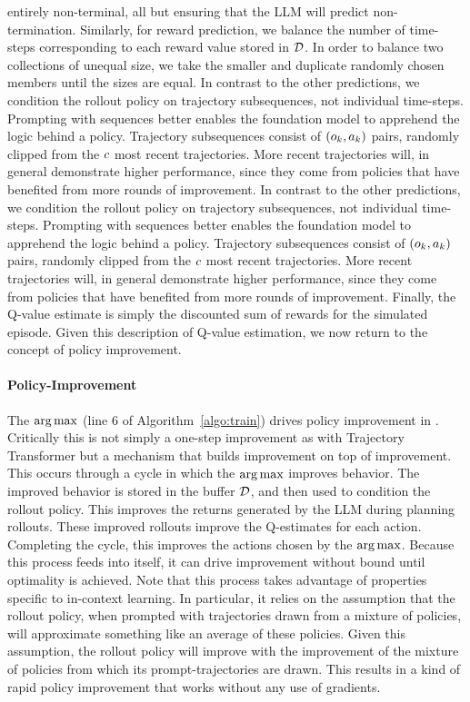 \documentclass{article}
\begin{document}
entirely non-terminal, all but ensuring that the LLM will predict
non-termination. Similarly, for
reward prediction, we balance the number of time-steps corresponding to each
reward value stored in $\mathcal{D}$. In order to balance two collections of
unequal size, we take the smaller and duplicate randomly chosen members
until the sizes are equal.
In contrast to the other predictions, we condition the rollout policy on
trajectory subsequences, not individual time-steps. Prompting with sequences
better enables the foundation model to apprehend the logic behind a policy. Trajectory
subsequences consist of $(\Obs_{k}, \Act_{k})$ pairs, randomly clipped from
the $c$ most recent trajectories. More recent trajectories will, in
general demonstrate higher performance, since they come from policies that have
benefited from more rounds of improvement.
In contrast to the other predictions, we condition the rollout policy on
trajectory subsequences, not individual time-steps. Prompting with sequences
better enables the foundation model to apprehend the logic behind a policy. Trajectory
subsequences consist of $(\Obs_{k}, \Act_{k})$ pairs, randomly clipped from
the $c$ most recent trajectories. More recent trajectories will, in
general demonstrate higher performance, since they come from policies that have
benefited from more rounds of improvement.
Finally, the Q-value estimate is simply the discounted sum of rewards for the
simulated episode. Given this description of Q-value estimation, we now return
to the concept of policy improvement.
\lstset{style=mystyle}
\def\graycolor{\color{lightgray}}
\def\blackcolor{\color{black}}
\paragraph{Policy-Improvement} The $\arg\max$ (line 6 of
Algorithm~\ref{algo:train}) drives policy improvement in \Algorithm{}.
Critically this is not simply a one-step improvement as with Trajectory
Transformer \parencite{janner_offline_2021} but a mechanism that builds improvement
on top of improvement. This occurs through a cycle in which the $\arg\max$
improves behavior. The improved behavior is stored in the buffer $\mathcal{D}$, and
then used to condition the rollout policy. This improves the returns generated
by the LLM during planning rollouts. These improved rollouts improve the
Q-estimates for each action. Completing the cycle, this improves the actions
chosen by the $\arg\max$. Because this process feeds into itself, it can drive
improvement without bound until optimality is achieved.
Note that this process takes advantage of properties specific to in-context
learning. In particular, it relies on the assumption that the rollout policy,
when prompted with trajectories drawn from a mixture of policies, will
approximate something like an average of these policies. Given this
assumption, the rollout policy will improve with the improvement of the
mixture of policies from which its prompt-trajectories are drawn. This
results in a kind of rapid policy improvement that works without any use of
gradients.
\end{document}
